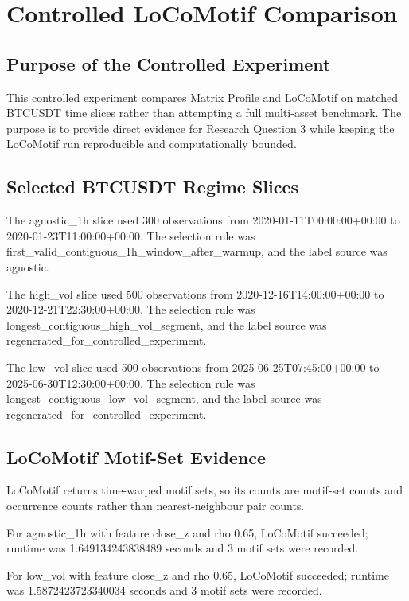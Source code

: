 \section{Controlled LoCoMotif Comparison}

\subsection{Purpose of the Controlled Experiment}

This controlled experiment compares Matrix Profile and LoCoMotif on matched BTCUSDT time slices rather than attempting a full multi-asset benchmark. The purpose is to provide direct evidence for Research Question 3 while keeping the LoCoMotif run reproducible and computationally bounded.

\subsection{Selected BTCUSDT Regime Slices}

The agnostic\_1h slice used 300 observations from 2020-01-11T00:00:00+00:00 to 2020-01-23T11:00:00+00:00. The selection rule was first\_valid\_contiguous\_1h\_window\_after\_warmup, and the label source was agnostic.

The high\_vol slice used 500 observations from 2020-12-16T14:00:00+00:00 to 2020-12-21T22:30:00+00:00. The selection rule was longest\_contiguous\_high\_vol\_segment, and the label source was regenerated\_for\_controlled\_experiment.

The low\_vol slice used 500 observations from 2025-06-25T07:45:00+00:00 to 2025-06-30T12:30:00+00:00. The selection rule was longest\_contiguous\_low\_vol\_segment, and the label source was regenerated\_for\_controlled\_experiment.

\subsection{LoCoMotif Motif-Set Evidence}

LoCoMotif returns time-warped motif sets, so its counts are motif-set counts and occurrence counts rather than nearest-neighbour pair counts.

For agnostic\_1h with feature close\_z and rho 0.65, LoCoMotif succeeded; runtime was 1.649134243838489 seconds and 3 motif sets were recorded.

For low\_vol with feature close\_z and rho 0.65, LoCoMotif succeeded; runtime was 1.5872423723340034 seconds and 3 motif sets were recorded.

